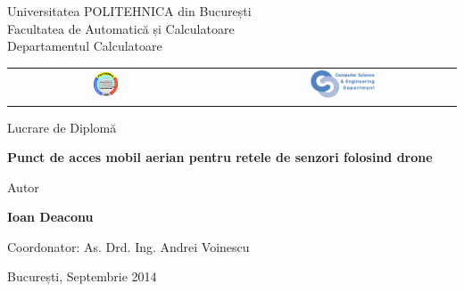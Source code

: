 


\pagestyle{empty}
\sffamily

\noindent
\begin{center}
	\Large
	Universitatea POLITEHNICA din București\\
	Facultatea de Automatică și Calculatoare\\
	Departamentul Calculatoare\\
	\begin{table}[h]
		\begin{center}
			\begin{tabular}{cccc}
				\includegraphics[width=0.13\textwidth]
				{img/upb.png}
				& & &
				\includegraphics[width=0.30\textwidth]
				{img/cs.png}
			\end{tabular}
		\end{center}
	\end{table}
\end{center}

\vfill\vfill
\begin{center}
	\Large
	Lucrare de Diplomă\\
\end{center}

\vfill
\begin{center}
	\HUGE\bfseries
	Punct de acces mobil aerian pentru retele de senzori folosind drone\\
	\vfill
	\large
\end{center}

\vfill
\begin{center}
	\Large
	Autor
\end{center}

\begin{center}
	\huge\bfseries
	Ioan Deaconu
\end{center}

\vfill\vfill\vfill
\begin{center}
	\Large
	Coordonator: As. Drd. Ing. Andrei Voinescu\\
\end{center}

\vfill
\begin{center}
	\large
	București, Septembrie 2014
\end{center}

\cleardoublepage

